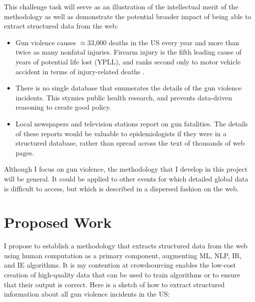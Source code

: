 \documentclass[11pt]{article}
\begin{document}
This challenge task will serve as an illustration of the intellectual merit of the methodology as well as demonstrate the potential broader impact of being able to extract structured data from the web:
\begin{itemize}
\item Gun violence causes $\approx$33,000 deaths in the US every year and more than twice as many nonfatal injuries. Firearm injury is the fifth leading cause of years of potential life lost (YPLL), and ranks second only to motor vehicle accident in terms of injury-related deaths  \cite{ficapresourcebook}. 
\item There is no single database that enumerates the details of the gun violence incidents.  This stymies public health research, and prevents data-driven reasoning to create good policy. 
\item Local newspapers and television stations report on gun fatalities. The details of these reports would be valuable to epidemiologists if they were in a structured database, rather than spread across the text of thousands of web pages.
\end{itemize}
Although I focus on gun violence, the methodology that I develop in this project will be general.  It could be applied to other events for which detailed global data is difficult to access, but which is described in a dispersed fashion on the web.  



\section{Proposed Work}

I propose to establish a methodology that extracts structured data from the web using human computation as a primary component, augmenting ML, NLP, IR, and IE algorithms.  It is my contention at crowdsourcing enables the low-cost creation of high-quality data that can be used to train algorithms or to ensure that their output is correct.   Here is a sketch of how to extract structured information about all gun violence incidents in the US:
\end{document}
